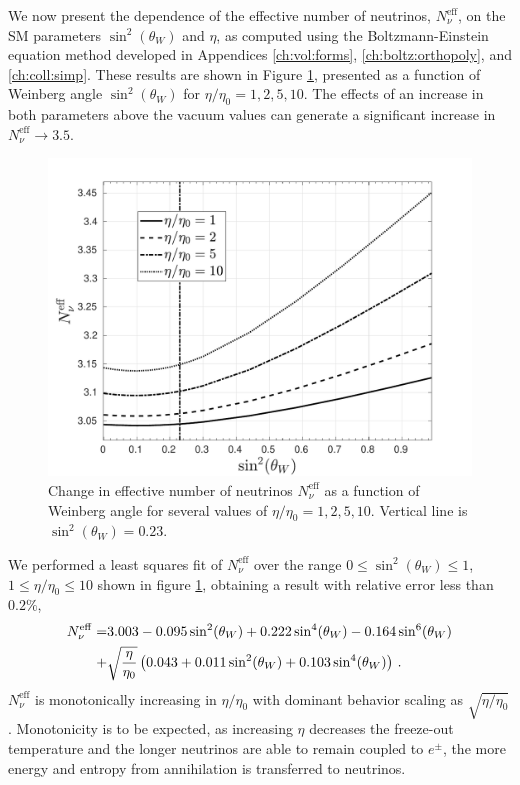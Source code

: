 We now present the dependence of the effective number of neutrinos, $N_\nu^{\mathrm{eff}}$, on the SM parameters $\sin^2(\theta_W)$ and $\eta$, as computed using the Boltzmann-Einstein equation method developed in Appendices \ref{ch:vol:forms}, \ref{ch:boltz:orthopoly}, and \ref{ch:coll:simp}. These results are shown in Figure \ref{N_nu_params}, presented as a function of Weinberg angle $\sin^2(\theta_W) $ for $\eta/\eta_0=1,2,5,10$. The effects of an increase in both parameters above the vacuum values can generate a significant increase in $N_\nu^{\mathrm{eff}}\to 3.5$.
\begin{figure}
\centerline{\includegraphics[width=0.90\linewidth]{04-birrell/ParametricStudies/Figures/N_eff2.pdf}}
\caption{Change in effective number of neutrinos $N_\nu^{\mathrm{eff}}$ as a function of Weinberg angle for several values of $\eta/\eta_0=1,2,5,10$. Vertical line is $\sin^2(\theta_W)=0.23$. }
\label{N_nu_params} 
 \end{figure}

We performed a least squares fit of $N_\nu^{\mathrm{eff}}$ over the range $0\leq \sin^2(\theta_W)\leq 1$, $1\leq \eta/\eta_0\leq 10$ shown in figure \ref{N_nu_params}, obtaining a result with relative error less than $0.2\%$,
\begin{align}
N_\nu^{\mathrm{eff}}=&3.003-0.095\sin^2(\theta_W) +0.222\sin^4(\theta_W ) -0.164\sin^6(\theta_W )\notag\\
+&\sqrt{\frac{\eta}{\eta_0}}\left(0.043+0.011\sin^2(\theta_W) +0.103\sin^4(\theta_W)\right)\,.
\end{align}
$N_\nu^{\mathrm{eff}}$ is monotonically increasing in $\eta/\eta_0$ with dominant behavior scaling as $\sqrt{ \eta/\eta_0}$. Monotonicity is to be expected, as increasing $\eta$ decreases the freeze-out temperature and the longer neutrinos are able to remain coupled to $e^\pm$, the more energy and entropy from annihilation is transferred to neutrinos.


